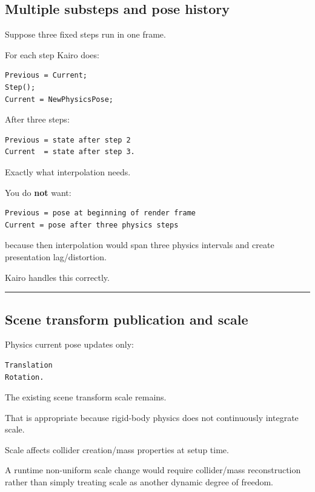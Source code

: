 \subsection{Multiple substeps and pose history}\label{06-engine-ii-ch038-multiple-substeps-and-pose-history}

Suppose three fixed steps run in one frame.

For each step Kairo does:

\begin{verbatim}
Previous = Current;
Step();
Current = NewPhysicsPose;
\end{verbatim}

After three steps:

\begin{verbatim}
Previous = state after step 2
Current  = state after step 3.
\end{verbatim}

Exactly what interpolation needs.

You do \textbf{not} want:

\begin{verbatim}
Previous = pose at beginning of render frame
Current = pose after three physics steps
\end{verbatim}

because then interpolation would span three physics intervals and create presentation lag/distortion.

Kairo handles this correctly.

\begin{center}\rule{0.5\linewidth}{0.5pt}\end{center}

\subsection{Scene transform publication and scale}\label{06-engine-ii-ch038-scene-transform-publication-and-scale}

Physics current pose updates only:

\begin{verbatim}
Translation
Rotation.
\end{verbatim}

The existing scene transform scale remains.

That is appropriate because rigid-body physics does not continuously integrate scale.

Scale affects collider creation/mass properties at setup time.

A runtime non-uniform scale change would require collider/mass reconstruction rather than simply treating scale as another dynamic degree of freedom.

